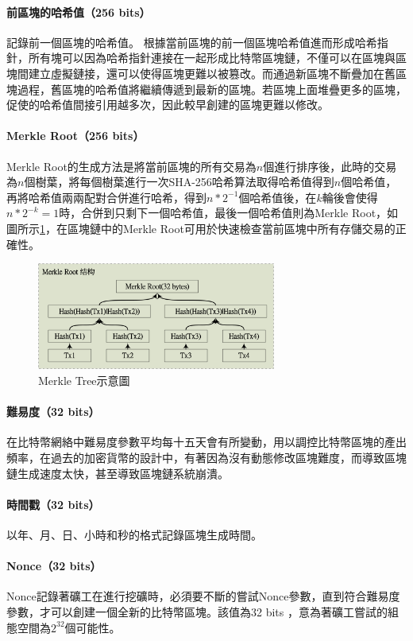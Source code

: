 			\paragraph{前區塊的哈希值（256 bits）}記錄前一個區塊的哈希值。 根據當前區塊的前一個區塊哈希值進而形成哈希指針，所有塊可以因為哈希指針連接在一起形成比特幣區塊鏈，不僅可以在區塊與區塊間建立虛擬鏈接，還可以使得區塊更難以被篡改。而通過新區塊不斷疊加在舊區塊過程，舊區塊的哈希值將繼續傳遞到最新的區塊。若區塊上面堆疊更多的區塊，促使的哈希值間接引用越多次，因此較早創建的區塊更難以修改。
			\paragraph{Merkle Root（256 bits）}Merkle Root的生成方法是將當前區塊的所有交易為$n$個進行排序後，此時的交易為$n$個樹葉，將每個樹葉進行一次SHA-256哈希算法取得哈希值得到$n$個哈希值，再將哈希值兩兩配對合併進行哈希，得到$n*2^{-1}$個哈希值後，在$k$輪後會使得$n*2^{-k}=1$時，合併到只剩下一個哈希值，最後一個哈希值則為Merkle Root，如圖所示\ref{MerkleRoot}，在區塊鏈中的Merkle Root可用於快速檢查當前區塊中所有存儲交易的正確性。

			\begin{figure}[h]
				\centering
				\includegraphics[width = 0.7\textwidth]{MerkleRoot.png}
				\caption{Merkle Tree示意圖}\label{MerkleRoot}
			\end{figure}

			\paragraph{難易度（32 bits）}在比特幣網絡中難易度參數平均每十五天會有所變動，用以調控比特幣區塊的產出頻率，在過去的加密貨幣的設計中，有著因為沒有動態修改區塊難度，而導致區塊鏈生成速度太快，甚至導致區塊鏈系統崩潰。
			\paragraph{時間戳（32 bits）}以年、月、日、小時和秒的格式記錄區塊生成時間。
			\paragraph{Nonce（32 bits）}Nonce記錄著礦工在進行挖礦時，必須要不斷的嘗試Nonce參數，直到符合難易度參數，才可以創建一個全新的比特幣區塊。該值為32 bits ，意為著礦工嘗試的組態空間為$2^{32}$個可能性。

